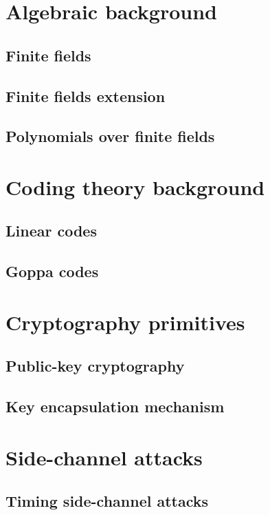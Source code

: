 \section{Algebraic background}
\subsection{Finite fields}
\subsection{Finite fields extension}
\subsection{Polynomials over finite fields}
\section{Coding theory background}
\subsection{Linear codes}
\subsection{Goppa codes}
\section{Cryptography primitives}
\subsection{Public-key cryptography}
\subsection{Key encapsulation mechanism}
\section{Side-channel attacks}
\subsection{Timing side-channel attacks}
